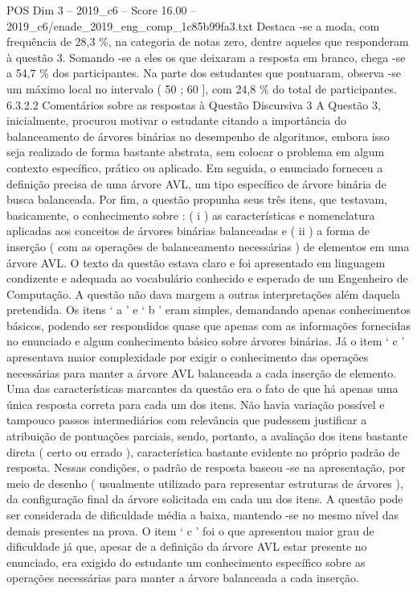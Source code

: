\begin{textsample}{POS Dim 3 – 2019\_c6 – Score 16.00 – 2019\_c6/enade\_2019\_eng\_comp\_1c85b99fa3.txt}
Destaca -se a moda, com frequência de 28,3 \%, na categoria de notas zero, dentre aqueles que responderam à questão 3.
Somando -se a eles os que deixaram a resposta em branco, chega -se a 54,7 \% dos participantes.
Na parte dos estudantes que pontuaram, observa -se um máximo local no intervalo ( 50 ; 60 ], com 24,8 \% do total de participantes. 6.3.2.2 Comentários sobre as respostas à Questão Discursiva 3 A Questão 3, inicialmente, procurou motivar o estudante citando a importância do balanceamento de árvores binárias no desempenho de algoritmos, embora isso seja realizado de forma bastante abstrata, sem colocar o problema em algum contexto específico, prático ou aplicado.
Em seguida, o enunciado forneceu a definição precisa de uma árvore AVL, um tipo específico de árvore binária de busca balanceada.
Por fim, a questão propunha seus três itens, que testavam, basicamente, o conhecimento sobre : ( i ) as características e nomenclatura aplicadas aos conceitos de árvores binárias balanceadas e ( ii ) a forma de inserção ( com as operações de balanceamento necessárias ) de elementos em uma árvore AVL.
O texto da questão estava claro e foi apresentado em linguagem condizente e adequada ao vocabulário conhecido e esperado de um Engenheiro de Computação.
A questão não dava margem a outras interpretações além daquela pretendida.
Os itens ‘ a ’ e ‘ b ’ eram simples, demandando apenas conhecimentos básicos, podendo ser respondidos quase que apenas com as informações fornecidas no enunciado e algum conhecimento básico sobre árvores binárias.
Já o item ‘ c ’ apresentava maior complexidade por exigir o conhecimento das operações necessárias para manter a árvore AVL balanceada a cada inserção de elemento.
Uma das características marcantes da questão era o fato de que há apenas uma única resposta correta para cada um dos itens.
Não havia variação possível e tampouco passos intermediários com relevância que pudessem justificar a atribuição de pontuações parciais, sendo, portanto, a avaliação dos itens bastante direta ( certo ou errado ), característica bastante evidente no próprio padrão de resposta.
Nessas condições, o padrão de resposta baseou -se na apresentação, por meio de desenho ( usualmente utilizado para representar estruturas de árvores ), da configuração final da árvore solicitada em cada um dos itens.
A questão pode ser considerada de dificuldade média a baixa, mantendo -se no mesmo nível das demais presentes na prova.
O item ‘ c ’ foi o que apresentou maior grau de dificuldade já que, apesar de a definição da árvore AVL estar presente no enunciado, era exigido do estudante um conhecimento específico sobre as operações necessárias para manter a árvore balanceada a cada inserção.

\end{textsample}
